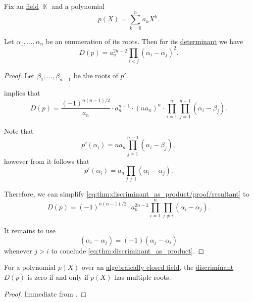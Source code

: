 \begin{proposition}\label{thm:discriminant_as_product}
  Fix an \hyperref[def:algebraically_closed_field]{} \hyperref[def:field]{field} \( \BbbK \) and a polynomial
  \begin{equation*}
    p(X) = \sum_{k=0}^n a_k X^k.
  \end{equation*}

  Let \( \alpha_1, \ldots, \alpha_n \) be an enumeration of its roots. Then for its \hyperref[def:matrix_determinant]{determinant} we have
  \begin{equation}\label{eq:thm:discriminant_as_product}
    D(p) = a_n^{2n - 2} \prod_{i < j} (\alpha_i - \alpha_j)^2.
  \end{equation}
\end{proposition}
\begin{proof}
  Let \( \beta_1, \ldots, \beta_{n-1} \) be the roots of \( p' \).

   implies that
  \begin{equation}\label{eq:thm:discriminant_as_product/proof/resultant}
    D(p) = \frac {(-1)^{n(n-1)/2}} {a_n} \cdot a_n^{n-1} \cdot (n a_n)^n \cdot \prod_{i=1}^n \prod_{j=1}^{n-1} (\alpha_i - \beta_j).
  \end{equation}

  Note that
  \begin{equation*}
    p'(\alpha_i) = n a_n \prod_{j=1}^{n-1} (\alpha_i - \beta_j),
  \end{equation*}
  however from  it follows that
  \begin{equation*}
    p'(\alpha_i) = a_n \prod_{j \neq i} (\alpha_i - \alpha_j).
  \end{equation*}

  Therefore, we can simplify \eqref{eq:thm:discriminant_as_product/proof/resultant} to
  \begin{equation*}
    D(p) = (-1)^{n(n-1)/2} \cdot a_n^{2n-2} \prod_{i=1}^n \prod_{j \neq i} (\alpha_i - \alpha_j).
  \end{equation*}

  It remains to use
  \begin{equation*}
    (\alpha_i - \alpha_j) = (-1)(\alpha_j - \alpha_i)
  \end{equation*}
  whenever \( j > i \) to conclude \eqref{eq:thm:discriminant_as_product}.
\end{proof}

\begin{corollary}\label{thm:discriminant_invertibility}
  For a polynomial \( p(X) \) over an \hyperref[def:algebraically_closed_field]{algebraically closed field}, the \hyperref[def:discriminant]{discriminant} \( D(p) \) is zero if and only if \( p(X) \) has multiple roots.
\end{corollary}
\begin{proof}
  Immediate from .
\end{proof}

